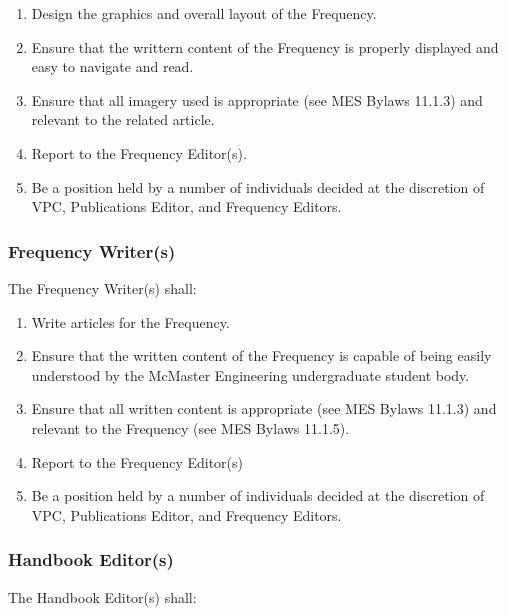 \begin{enumerate} 
  \item    
   Design the graphics and overall layout of the Frequency. 
  \item    
   Ensure that the writtern content of the Frequency is properly displayed and easy to navigate and read. 
  \item     
   Ensure that all imagery used is appropriate (see MES Bylaws 11.1.3) and relevant to the related article. 
  \item     
   Report to the Frequency Editor(s). 
  \item     
   Be a position held by a number of individuals decided at the discretion of VPC, Publications Editor, and Frequency Editors. 
\end{enumerate} 

\subsubsection{Frequency Writer(s)}
\label{frequency-writers} 
The Frequency Writer(s) shall: 

\begin{enumerate} 
  \item     
   Write articles for the Frequency. 
  \item    
   Ensure that the written content of the Frequency is capable of being easily understood by the McMaster Engineering undergraduate student body. 
  \item    
   Ensure that all written content is appropriate (see MES Bylaws 11.1.3) and relevant to the Frequency (see MES Bylaws 11.1.5). 
  \item    
   Report to the Frequency Editor(s) 
  \item    
   Be a position held by a number of individuals decided at the discretion of VPC, Publications Editor, and Frequency Editors. 
\end{enumerate} 

\subsubsection{Handbook Editor(s)}
\label{handbook-editors}
The Handbook Editor(s) shall:

